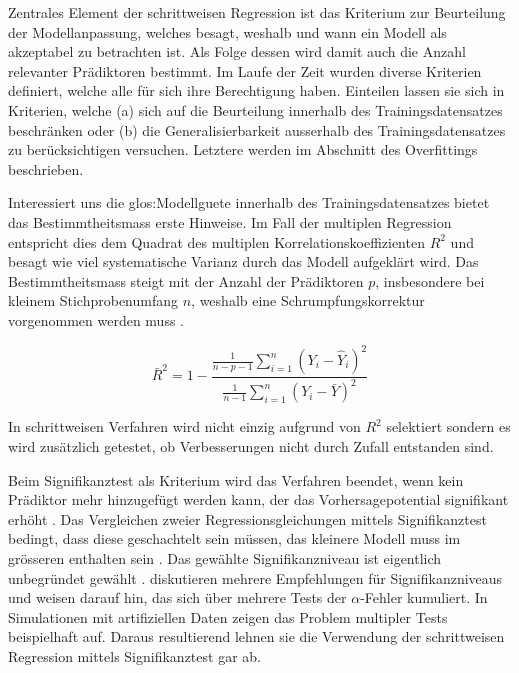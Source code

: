 Zentrales Element der schrittweisen Regression ist das Kriterium zur Beurteilung der  Modellanpassung, welches besagt, weshalb und wann ein Modell als akzeptabel zu betrachten ist. Als Folge dessen wird damit auch die Anzahl relevanter Prädiktoren bestimmt. Im Laufe der Zeit wurden diverse Kriterien definiert, welche alle für sich ihre Berechtigung haben.
Einteilen lassen sie sich in Kriterien, welche (a) sich auf die Beurteilung innerhalb des Trainingsdatensatzes beschränken oder (b) die Generalisierbarkeit ausserhalb des Trainingsdatensatzes zu berücksichtigen versuchen. Letztere werden im Abschnitt des Overfittings beschrieben.

Interessiert uns die \Gls{glos:Modellguete} innerhalb des Trainingsdatensatzes bietet das Bestimmtheitsmass erste Hinweise. Im Fall der multiplen Regression entspricht dies dem Quadrat des multiplen Korrelationskoeffizienten $R^2$ und  besagt wie viel systematische Varianz durch das Modell aufgeklärt  wird. 
Das Bestimmtheitsmass steigt mit der Anzahl der Prädiktoren $p$, insbesondere bei kleinem Stichprobenumfang $n$, weshalb eine Schrumpfungskorrektur vorgenommen werden muss \cite[p. 451]{bortz2011}. 

\begin{equation}
\bar R^2=1-\frac{\displaystyle \frac{1}{n-p-1} \sum_{i=1}^n (Y_i-\hat{Y}_i)^2}{\displaystyle \frac{1}{n-1} \sum_{i=1}^n (Y_i-\bar{Y})^2}
\tag{korrigiertes Bestimmtheitsmass}
\end{equation}

In schrittweisen Verfahren wird nicht einzig aufgrund von $R^2$ selektiert sondern es wird zusätzlich getestet, ob Verbesserungen nicht durch Zufall entstanden sind. 

Beim Signifikanztest als Kriterium wird das Verfahren beendet, wenn kein Prädiktor mehr hinzugefügt werden kann, der das Vorhersagepotential signifikant erhöht \cite[p.48]{bendel1977comparison}. 
Das Vergleichen zweier Regressionsgleichungen mittels Signifikanztest bedingt, dass diese geschachtelt sein müssen, das kleinere Modell muss im grösseren enthalten sein \cite[p. 508]{jacob2003applied}.
Das gewählte Signifikanzniveau ist eigentlich unbegründet gewählt \cite[p. 174]{weakliem2004introduction}.  diskutieren mehrere Empfehlungen für Signifikanzniveaus und weisen darauf hin, das sich über mehrere Tests der $\alpha$-Fehler kumuliert. 
In  Simulationen mit artifiziellen Daten zeigen  das  Problem multipler Tests beispielhaft auf. 
Daraus resultierend lehnen sie die Verwendung der schrittweisen Regression mittels Signifikanztest gar ab.

